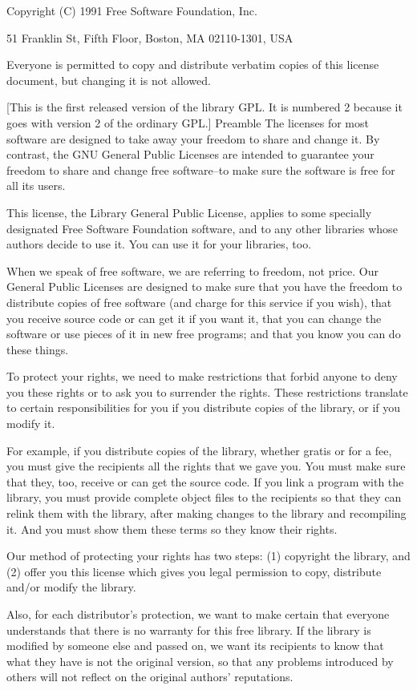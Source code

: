 \noindent Copyright (C) 1991 Free Software Foundation, Inc.

51 Franklin St, Fifth Floor, Boston, MA  02110-1301, USA


Everyone is permitted to copy and distribute verbatim copies
of this license document, but changing it is not allowed.

[This is the first released version of the library GPL.  It is
numbered 2 because it goes with version 2 of the ordinary GPL.]
Preamble
The licenses for most software are designed to take away your freedom to share and change it. By contrast, the GNU General Public Licenses are intended to guarantee your freedom to share and change free software--to make sure the software is free for all its users. 

This license, the Library General Public License, applies to some specially designated Free Software Foundation software, and to any other libraries whose authors decide to use it. You can use it for your libraries, too. 

When we speak of free software, we are referring to freedom, not price. Our General Public Licenses are designed to make sure that you have the freedom to distribute copies of free software (and charge for this service if you wish), that you receive source code or can get it if you want it, that you can change the software or use pieces of it in new free programs; and that you know you can do these things. 

To protect your rights, we need to make restrictions that forbid anyone to deny you these rights or to ask you to surrender the rights. These restrictions translate to certain responsibilities for you if you distribute copies of the library, or if you modify it. 

For example, if you distribute copies of the library, whether gratis or for a fee, you must give the recipients all the rights that we gave you. You must make sure that they, too, receive or can get the source code. If you link a program with the library, you must provide complete object files to the recipients so that they can relink them with the library, after making changes to the library and recompiling it. And you must show them these terms so they know their rights. 

Our method of protecting your rights has two steps: (1) copyright the library, and (2) offer you this license which gives you legal permission to copy, distribute and/or modify the library. 

Also, for each distributor's protection, we want to make certain that everyone understands that there is no warranty for this free library. If the library is modified by someone else and passed on, we want its recipients to know that what they have is not the original version, so that any problems introduced by others will not reflect on the original authors' reputations. 

